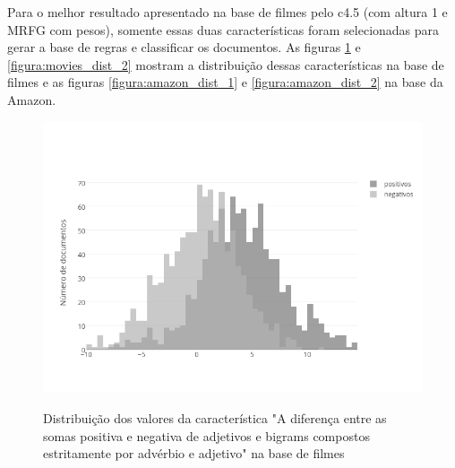 \documentclass[template.tex]{subfiles}
\begin{document}
Para o melhor resultado apresentado na base de filmes pelo c4.5 (com altura 1 e MRFG com pesos), somente essas duas características foram selecionadas para gerar a base de regras e classificar os documentos. As figuras \ref{figura:movies_dist_1} e \ref{figura:movies_dist_2} mostram a distribuição dessas características na base de filmes e as figuras \ref{figura:amazon_dist_1} e \ref{figura:amazon_dist_2} na base da Amazon. 


\begin{figure}[phtb]
\caption{Distribuição dos valores da característica "A diferença entre as somas positiva e negativa de adjetivos e bigrams compostos estritamente por advérbio e adjetivo" na base de filmes}
\centering
\includegraphics[scale=0.50]{movies_positive_to_negative_ratio_of_adjectives_sum_and_bigrams_with_adjectives}
\label{figura:movies_dist_1}
\end{figure}
\end{document}
